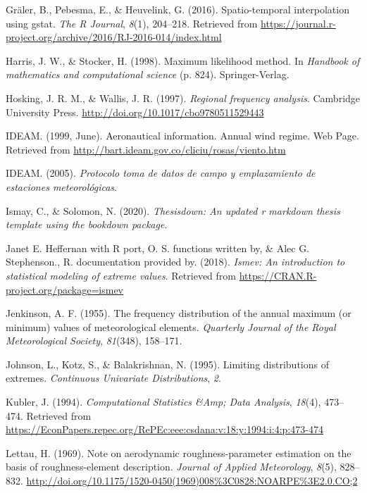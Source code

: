 \documentclass[12pt,oneside]{reedthesis}
\begin{document}
\leavevmode\hypertarget{ref-Graeler2016}{}%
Gräler, B., Pebesma, E., \& Heuvelink, G. (2016). Spatio-temporal interpolation using gstat. \emph{The R Journal}, \emph{8}(1), 204--218. Retrieved from \url{https://journal.r-project.org/archive/2016/RJ-2016-014/index.html}

\leavevmode\hypertarget{ref-Harris1994}{}%
Harris, J. W., \& Stocker, H. (1998). Maximum likelihood method. In \emph{Handbook of mathematics and computational science} (p. 824). Springer-Verlag.

\leavevmode\hypertarget{ref-Hosking1997}{}%
Hosking, J. R. M., \& Wallis, J. R. (1997). \emph{Regional frequency analysis}. Cambridge University Press. \url{http://doi.org/10.1017/cbo9780511529443}

\leavevmode\hypertarget{ref-ideam1999}{}%
IDEAM. (1999, June). Aeronautical information. Annual wind regime. Web Page. Retrieved from \url{http://bart.ideam.gov.co/cliciu/rosas/viento.htm}

\leavevmode\hypertarget{ref-ideam2005}{}%
IDEAM. (2005). \emph{Protocolo toma de datos de campo y emplazamiento de estaciones meteorológicas}.

\leavevmode\hypertarget{ref-Ismay2020}{}%
Ismay, C., \& Solomon, N. (2020). \emph{Thesisdown: An updated r markdown thesis template using the bookdown package}.

\leavevmode\hypertarget{ref-JanetE.HeffernanwithRport2018}{}%
Janet E. Heffernan with R port, O. S. functions written by, \& Alec G. Stephenson., R. documentation provided by. (2018). \emph{Ismev: An introduction to statistical modeling of extreme values}. Retrieved from \url{https://CRAN.R-project.org/package=ismev}

\leavevmode\hypertarget{ref-Jenkinson1955}{}%
Jenkinson, A. F. (1955). The frequency distribution of the annual maximum (or minimum) values of meteorological elements. \emph{Quarterly Journal of the Royal Meteorological Society}, \emph{81}(348), 158--171.

\leavevmode\hypertarget{ref-Johnson1995}{}%
Johnson, L., Kotz, S., \& Balakrishnan, N. (1995). Limiting distributions of extremes. \emph{Continuous Univariate Distributions}, \emph{2}.

\leavevmode\hypertarget{ref-Kubler1994}{}%
Kubler, J. (1994). \emph{Computational Statistics \&Amp; Data Analysis}, \emph{18}(4), 473--474. Retrieved from \url{https://EconPapers.repec.org/RePEc:eee:csdana:v:18:y:1994:i:4:p:473-474}

\leavevmode\hypertarget{ref-Lettau1969}{}%
Lettau, H. (1969). Note on aerodynamic roughness-parameter estimation on the basis of roughness-element description. \emph{Journal of Applied Meteorology}, \emph{8}(5), 828--832. \url{http://doi.org/10.1175/1520-0450(1969)008\%3C0828:NOARPE\%3E2.0.CO;2}
\end{document}
